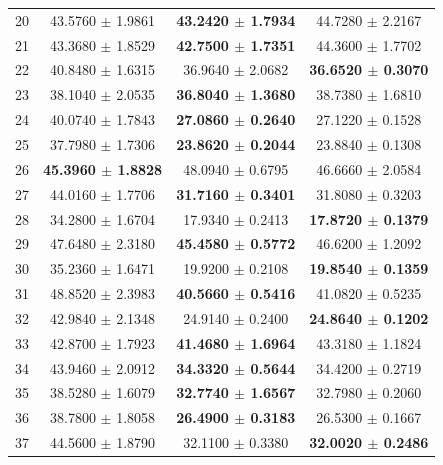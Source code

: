 \documentclass[twocolumn]{article}
\begin{document}
\begin{table}[!htb]
\begin{tabular}{|c||c|c|c|}
20 & 43.5760 $\pm$ 1.9861 & \textbf{43.2420 $\pm$ 1.7934} & 44.7280 $\pm$ 2.2167\\
21 & 43.3680 $\pm$ 1.8529 & \textbf{42.7500 $\pm$ 1.7351} & 44.3600 $\pm$ 1.7702\\
22 & 40.8480 $\pm$ 1.6315 & 36.9640 $\pm$ 2.0682 & \textbf{36.6520 $\pm$ 0.3070}\\
23 & 38.1040 $\pm$ 2.0535 & \textbf{36.8040 $\pm$ 1.3680} & 38.7380 $\pm$ 1.6810\\
%
%
24 & 40.0740 $\pm$ 1.7843 & \textbf{27.0860 $\pm$ 0.2640} & 27.1220 $\pm$ 0.1528\\
25 & 37.7980 $\pm$ 1.7306 & \textbf{23.8620 $\pm$ 0.2044} & 23.8840 $\pm$ 0.1308\\
26 & \textbf{45.3960 $\pm$ 1.8828} & 48.0940 $\pm$ 0.6795 & 46.6660 $\pm$ 2.0584\\
27 & 44.0160 $\pm$ 1.7706 & \textbf{31.7160 $\pm$ 0.3401} & 31.8080 $\pm$ 0.3203\\
28 & 34.2800 $\pm$ 1.6704 & 17.9340 $\pm$ 0.2413 & \textbf{17.8720 $\pm$ 0.1379}\\
29 & 47.6480 $\pm$ 2.3180 & \textbf{45.4580 $\pm$ 0.5772} & 46.6200 $\pm$ 1.2092\\
30 & 35.2360 $\pm$ 1.6471 & 19.9200 $\pm$ 0.2108 & \textbf{19.8540 $\pm$ 0.1359}\\
31 & 48.8520 $\pm$ 2.3983 & \textbf{40.5660 $\pm$ 0.5416} & 41.0820 $\pm$ 0.5235\\
32 & 42.9840 $\pm$ 2.1348 & 24.9140 $\pm$ 0.2400 & \textbf{24.8640 $\pm$ 0.1202}\\
33 & 42.8700 $\pm$ 1.7923 & \textbf{41.4680 $\pm$ 1.6964} & 43.3180 $\pm$ 1.1824\\
34 & 43.9460 $\pm$ 2.0912 & \textbf{34.3320 $\pm$ 0.5644} & 34.4200 $\pm$ 0.2719\\
35 & 38.5280 $\pm$ 1.6079 & \textbf{32.7740 $\pm$ 1.6567} & 32.7980 $\pm$ 0.2060\\
36 & 38.7800 $\pm$ 1.8058 & \textbf{26.4900 $\pm$ 0.3183} & 26.5300 $\pm$ 0.1667\\
37 & 44.5600 $\pm$ 1.8790 & 32.1100 $\pm$ 0.3380 & \textbf{32.0020 $\pm$ 0.2486}\\

\end{tabular}
\end{table}
\end{document}
